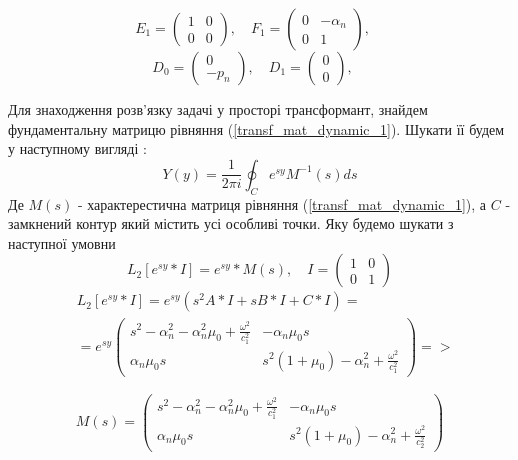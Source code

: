 \begin{equation*}
    E_1 = \begin{pmatrix}
        1 & 0 \\
        0 & 0
    \end{pmatrix}, \quad
    F_1 = \begin{pmatrix}
        0 & -\alpha_n \\
        0 & 1
    \end{pmatrix}, \quad
\end{equation*}
\begin{equation*}
    D_0 = \begin{pmatrix}
        0 \\
        -p_n
    \end{pmatrix}, \quad
    D_1 = \begin{pmatrix}
        0 \\
        0
    \end{pmatrix}, \quad
\end{equation*}

Для знаходження розв'язку задачі у просторі трансформант, знайдем фундаментальну матрицю рівняння (\ref{transf_mat_dynamic_1}).
Шукати її будем у наступному вигляді \cite{gantmaher}:
\begin{equation}
    Y(y) = \frac{1}{2\pi i} \oint_C e^{sy} M^{-1}(s)ds
\end{equation}
Де $M(s)$ - характерестична матриця рівняння (\ref{transf_mat_dynamic_1}), а $C$ - замкнений контур який містить усі особливі точки. Яку будемо шукати з наступної умовни
\begin{equation}
    L_2\left[ e^{sy}*I \right] = e^{sy} * M(s), \quad I = \begin{pmatrix} 1 & 0 \\ 0 & 1 \end{pmatrix}
\end{equation}
\begin{align*}
    &L_2\left[ e^{sy}*I \right] = e^{sy} \left( s^2A * I + s B*I + C*I \right) = \\
    &=e^{sy} \begin{pmatrix}
        s^2 - \alpha_n^2 - \alpha_n^2\mu_0 + \frac{\omega^2}{c_1^2} & -\alpha_n \mu_0 s \\
        \alpha_n \mu_0 s & s^2 (1 + \mu_0) -\alpha_n^2 + \frac{\omega^2}{c_1^2}
     \end{pmatrix} =>
\end{align*}

\begin{equation}
    M(s) = \begin{pmatrix}
        s^2 - \alpha_n^2 - \alpha_n^2\mu_0 + \frac{\omega^2}{c_1^2} & -\alpha_n \mu_0 s \\
        \alpha_n \mu_0 s & s^2 (1 + \mu_0) -\alpha_n^2 + \frac{\omega^2}{c_2^2}
     \end{pmatrix}
\end{equation}

